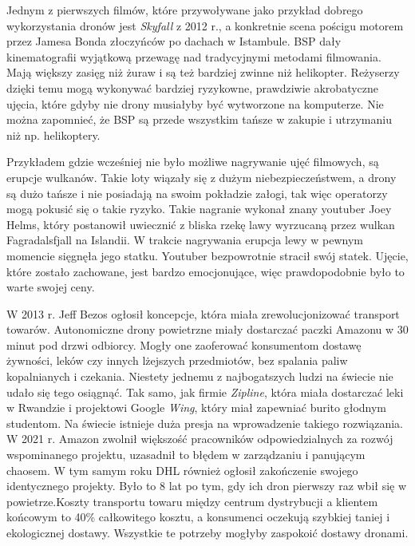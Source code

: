 Jednym z pierwszych filmów, które przywoływane jako przykład dobrego wykorzystania dronów jest \textit{Skyfall} z 2012 r., a konkretnie scena pościgu motorem przez Jamesa Bonda złoczyńców po dachach w Istambule. BSP dały kinematografii wyjątkową przewagę nad tradycyjnymi metodami filmowania. Mają większy zasięg niż żuraw i są też bardziej zwinne niż helikopter. Reżyserzy dzięki temu mogą wykonywać bardziej ryzykowne, prawdziwie akrobatyczne ujęcia, które gdyby nie drony musiałyby być wytworzone na komputerze. Nie można zapomnieć, że BSP są przede wszystkim tańsze w zakupie i utrzymaniu niż np. helikoptery.\cite{washingtonpost-drone-movie}

Przykładem gdzie wcześniej nie było możliwe nagrywanie ujęć filmowych, są erupcje wulkanów. Takie loty wiązały się z dużym niebezpieczeństwem, a drony są dużo tańsze i nie posiadają na swoim pokładzie załogi, tak więc operatorzy mogą pokusić się o takie ryzyko. Takie nagranie wykonał znany youtuber Joey Helms, który postanowił uwiecznić z bliska rzekę lawy wyrzucaną przez wulkan Fagradalsfjall na Islandii. W trakcie nagrywania erupcja lewy w pewnym momencie sięgnęła jego statku. Youtuber bezpowrotnie stracił swój statek. Ujęcie, które zostało zachowane, jest bardzo emocjonujące, więc prawdopodobnie było to warte swojej ceny.\cite{dron-lawa-pogoda}


W 2013 r. Jeff Bezos ogłosił koncepcje, która miała zrewolucjonizować transport towarów. Autonomiczne drony powietrzne miały dostarczać paczki Amazonu w 30 minut pod drzwi odbiorcy. Mogły one zaoferować konsumentom dostawę żywności, leków czy innych lżejszych przedmiotów, bez spalania paliw kopalnianych i czekania. Niestety jednemu z najbogatszych ludzi na świecie nie udało się tego osiągnąć. Tak samo, jak firmie \textit{Zipline}, która miała dostarczać leki w Rwandzie i projektowi Google \textit{Wing}, który miał zapewniać burito głodnym studentom. Na świecie istnieje duża presja na wprowadzenie takiego rozwiązania. W 2021 r. Amazon zwolnił większość pracowników odpowiedzialnych za rozwój wspominanego projektu, uzasadnił to błędem w zarządzaniu i panującym chaosem. W tym samym roku DHL również ogłosił zakończenie swojego identycznego projekty. Było to 8 lat po tym, gdy ich dron pierwszy raz wbił się w powietrze.Koszty transportu towaru między centrum dystrybucji a klientem końcowym to 40\% całkowitego kosztu, a konsumenci oczekują szybkiej taniej i ekologicznej dostawy. Wszystkie te potrzeby mogłyby zaspokoić dostawy dronami.

